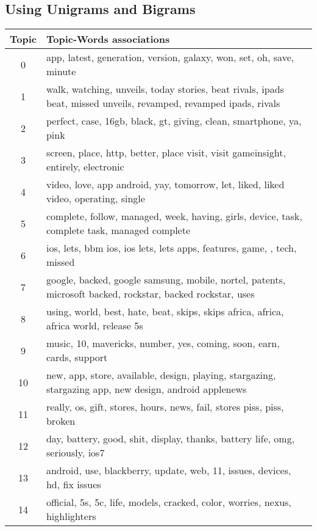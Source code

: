 \subsection{Using Unigrams and Bigrams}
\label{sec:using_unigrams_bigrams}
\begin{table}
  \begin{tabular}{c p{16cm}} \toprule
    Topic & Topic-Words associations \\ \midrule
    0     & app, latest, generation, version, galaxy, won, set, oh, save, minute \\ \midrule
    1     & walk, watching, unveils, today stories, beat rivals, ipads beat, missed unveils, revamped, revamped ipads, rivals \\ \midrule
    2     & perfect, case, 16gb, black, gt, giving, clean, smartphone, ya, pink \\ \midrule
    3     & screen, place, http, better, place visit, visit gameinsight, entirely, electronic \\ \midrule
    4     & video, love, app android, yay, tomorrow, let, liked, liked video, operating, single \\ \midrule
    5     & complete, follow, managed, week, having, girls, device, task, complete task, managed complete \\ \midrule
    6     & ios, lets, bbm ios, ios lets, lets apps, features, game, , tech, missed \\ \midrule
    7     & google, backed, google samsung, mobile, nortel, patents, microsoft backed, rockstar, backed rockstar, uses \\ \midrule
    8     & using, world, best, hate, beat, skips, skips africa, africa, africa world, release 5s \\ \midrule
    9     & music, 10, mavericks, number, yes, coming, soon, earn, cards, support \\ \midrule
    10    & new, app, store, available, design, playing, stargazing, stargazing app, new design, android applenews \\ \midrule
    11    & really, os, gift, stores, hours, news, fail, stores piss, piss, broken \\ \midrule
    12    & day, battery, good, shit, display, thanks, battery life, omg, seriously, ios7 \\ \midrule
    13    & android, use, blackberry, update, web, 11, issues, devices, hd, fix issues \\ \midrule
    14    & official, 5s, 5c, life, models, cracked, color, worries, nexus, highlighters \\ \midrule

\end{tabular}
\end{table}
